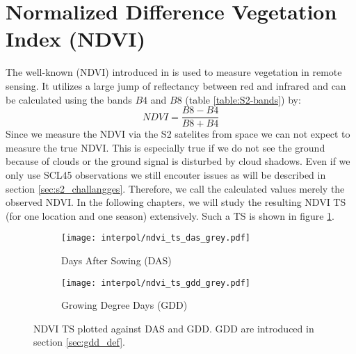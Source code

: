 \section{Normalized Difference Vegetation Index (NDVI)}{%
	The well-known  ({NDVI}) introduced in \cite{rouseMonitoringVernalAdvancement1974} is used to measure vegetation in remote sensing. It utilizes a large jump of reflectancy between red and infrared and can be calculated using the bands $B4$ and $B8$ (table \ref{table:S2-bands}) by:
	\begin{equation}
		NDVI = \frac{B8 - B4}{B8 + B4}
		\label{eq:ndvi}
	\end{equation}
	Since we measure the NDVI via the S2 satelites from space we can not expect to measure the true NDVI. This is especially true if we do not see the ground because of clouds or the ground signal is disturbed by cloud shadows. Even if we only use SCL45 observations we still encouter issues as will be described in section \ref{sec:s2_challangges}. Therefore, we call the calculated values merely the {observed NDVI}. In the following chapters, we will study the resulting NDVI {TS} (for one location and one season) extensively. Such a {TS} is shown in figure \ref{interpol/ndvi_ts_das_grey.pdf}.
	\begin{figure}[!h]
		\centering
		\begin{subfigure}{.47\textwidth}
			\texttt{[image: interpol/ndvi\_ts\_das\_grey.pdf]}
			\caption{Days After Sowing (DAS)}
			\label{interpol/ndvi_ts_das_grey.pdf}
		\end{subfigure}%
		\hfill
		\begin{subfigure}{.47\textwidth}
			\texttt{[image: interpol/ndvi\_ts\_gdd\_grey.pdf]}
			\caption{Growing Degree Days (GDD)}
			\label{interpol/ndvi_ts_gdd_grey.pdf}
		\end{subfigure}
		\caption{NDVI {TS} plotted against DAS and GDD. GDD are introduced in section \ref{sec:gdd_def}.}
		\label{fig:raw_ndvi_ts}
	\end{figure}
}

